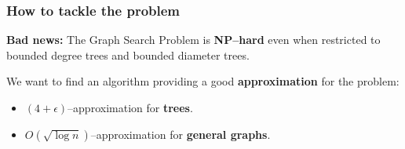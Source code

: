 \documentclass{beamer}
\newcommand{\br}[1]{\mathopen{}\left( #1 \right)}
\begin{document}


\begin{frame}
\frametitle{How to tackle the problem}
\textbf{Bad news:}
The Graph Search Problem is \textbf{NP–hard} even when restricted to bounded degree trees and bounded diameter trees. 
\pause

We want to find an algorithm providing a good \textbf{approximation} for the problem:
\begin{itemize}
    \item $\br{4+\epsilon}$–approximation for \textbf{trees}.
    \item $O\br{\sqrt{\log n}}$–approximation for \textbf{general graphs}.
\end{itemize}
\end{frame}
\end{document}
